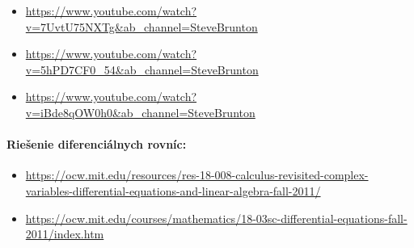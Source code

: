 \documentclass[a4paper, 10pt, ]{article}
\begin{document}
\begin{itemize}[leftmargin=0pt, labelsep=3mm, itemsep=0pt]

	\item \url{https://www.youtube.com/watch?v=7UvtU75NXTg&ab_channel=SteveBrunton}
	\item \url{https://www.youtube.com/watch?v=5hPD7CF0_54&ab_channel=SteveBrunton}
	\item \url{https://www.youtube.com/watch?v=iBde8qOW0h0&ab_channel=SteveBrunton}

\end{itemize}

\paragraph{Riešenie diferenciálnych rovníc:}

\begin{itemize}[leftmargin=0pt, labelsep=3mm, itemsep=0pt]

    \sloppy

	\item \url{https://ocw.mit.edu/resources/res-18-008-calculus-revisited-complex-variables-differential-equations-and-linear-algebra-fall-2011/}

    \item \url{https://ocw.mit.edu/courses/mathematics/18-03sc-differential-equations-fall-2011/index.htm}

\end{itemize}

\fussy
\end{document}
